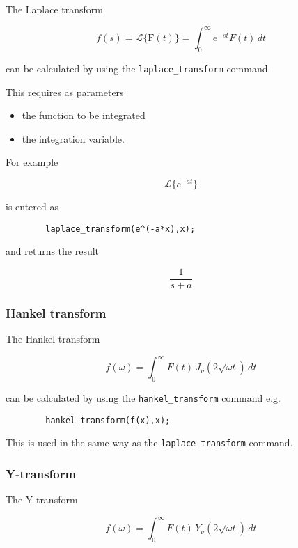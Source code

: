 The Laplace transform

\[
f(s) = \mathcal{L}\{\mathrm{F}(t)\} = \int_{0}^{\infty} e^{-st}F(t)\,dt
\]

can be calculated by using the \verb+laplace_transform+ command.

This requires as parameters

\begin{itemize}
\item the function to be integrated
\item the integration variable.
\end{itemize}

For example

\[
\mathcal{L}\{e^{-at}\}
\]

is entered as

\begin{verbatim}
        laplace_transform(e^(-a*x),x);
\end{verbatim}

and returns the result

\[
\frac{1}{s+a}
\]

\subsubsection{Hankel transform}
\hypertarget{operator:HANKEL_TRANSFORM}{}

The Hankel transform

\[
f(\omega) = \int_{0}^{\infty} F(t) \,J_{\nu}(2\sqrt{\omega t}) \,dt
\]

can be calculated by using the \verb+hankel_transform+ command e.g.

\begin{verbatim}
        hankel_transform(f(x),x);
\end{verbatim}

This is used in the same way as the \texttt{laplace\_transform} command.

\subsubsection{Y-transform}
\hypertarget{operator:Y_TRANSFORM}{}

The Y-transform

\[
f(\omega) = \int_{0}^{\infty} F(t) \,Y_{\nu}(2\sqrt{\omega t}) \,dt
\]

